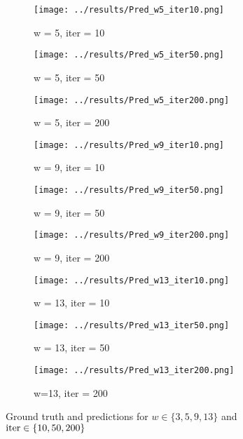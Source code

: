 \documentclass{article}
\begin{document}
{\begin{figure}[h]
    \begin{subfigure}[t]{0.15\textwidth}
        \centering
        \texttt{[image: ../results/Pred\_w5\_iter10.png]}
        \caption{w = 5, iter = 10}
    \end{subfigure}
    \begin{subfigure}[t]{0.15\textwidth}
        \centering
        \texttt{[image: ../results/Pred\_w5\_iter50.png]}
        \caption{w = 5, iter = 50}
    \end{subfigure}
    \begin{subfigure}[t]{0.15\textwidth}
        \centering
        \texttt{[image: ../results/Pred\_w5\_iter200.png]}
        \caption{w = 5, iter = 200}
    \end{subfigure}

    \begin{subfigure}[t]{0.15\textwidth}
        \centering
        \texttt{[image: ../results/Pred\_w9\_iter10.png]}
        \caption{w = 9, iter = 10}
    \end{subfigure}
    \begin{subfigure}[t]{0.15\textwidth}
        \centering
        \texttt{[image: ../results/Pred\_w9\_iter50.png]}
        \caption{w = 9, iter = 50}
    \end{subfigure}
    \begin{subfigure}[t]{0.15\textwidth}
        \centering
        \texttt{[image: ../results/Pred\_w9\_iter200.png]}
        \caption{w = 9, iter = 200}
    \end{subfigure}

    \begin{subfigure}[t]{0.15\textwidth}
        \centering
        \texttt{[image: ../results/Pred\_w13\_iter10.png]}
        \caption{w = 13, iter = 10}
    \end{subfigure}
    \begin{subfigure}[t]{0.15\textwidth}
        \centering
        \texttt{[image: ../results/Pred\_w13\_iter50.png]}
        \caption{w = 13, iter = 50}
    \end{subfigure}    
    \begin{subfigure}[t]{0.15\textwidth}
        \centering
        \texttt{[image: ../results/Pred\_w13\_iter200.png]}
        \caption{w=13, iter = 200}
    \end{subfigure}
    
    \caption{Ground truth and predictions for $w \in \{3,5,9,13\}$ and $\textnormal{iter} \in \{10, 50, 200\}$}
\label{fig:results}
\end{figure}
\begin{figure}
\centering


\end{figure}}
\end{document}
